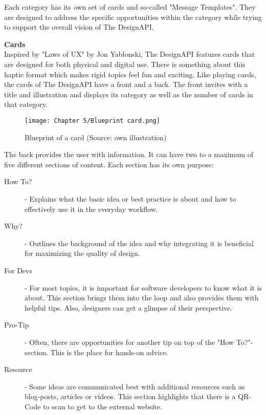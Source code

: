 Each category has its own set of cards and so-called "Message Templates". They are designed to
address the specific opportunities within the category while trying to support the overall vision of
The DesignAPI.

\textbf{Cards}\\
Inspired by "Laws of UX" by Jon Yablonski, The DesignAPI features cards that are designed for both
physical and digital use. There is something about this haptic format which makes rigid topics feel
fun and exciting. Like playing cards, the cards of The DesignAPI have a front and a back. The front
invites with a title and illustration and displays its category as well as the number of cards in
that category.

\begin{figure}[H]
      \centering
      \texttt{[image: Chapter 5/Blueprint card.png]}
      \caption{Blueprint of a card (Source: own illustration)}
\end{figure}

The back provides the user with information. It can have two to a maximum of five different sections
of content. Each section has its own purpose:

\begin{description}
      \item[How To?] - Explains what the basic idea or best practice is about and how to
            effectively use it in the everyday workflow.

      \item[Why?] - Outlines the background of the idea and why integrating it is beneficial for
            maximizing the quality of design.

      \item[For Devs] - For most topics, it is important for software developers to know what it is
      about. This section brings them into the loop and also provides them with helpful tips. Also,
      designers can get a glimpse of their perspective.

      \item[Pro-Tip] - Often, there are opportunities for another tip on top of the "How To?"-section.
            This is the place for hands-on advice.

      \item[Resource] - Some ideas are communicated best with additional resources such as blog-posts,
            articles or videos. This section highlights that there is a QR-Code to scan to get to the
            external website.
\end{description}

